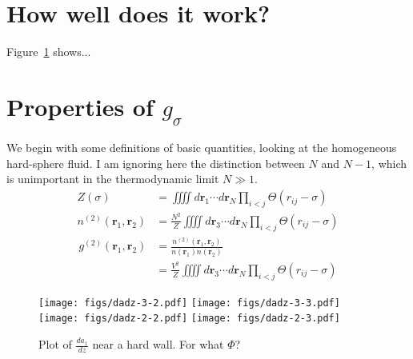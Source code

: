 \documentclass[letterpaper,twocolumn,amsmath,amssymb,pre,aps,10pt]{revtex4-1}
\newcommand{\rr}{\textbf{r}}
\begin{document}
\section{How well does it work?}
Figure~\ref{fig:dadz} shows...

\appendix

\section{Properties of $g_\sigma$}
We begin with some definitions of basic quantities, looking at the
homogeneous hard-sphere fluid.  I am ignoring here the distinction
between $N$ and $N-1$, which is unimportant in the thermodynamic limit
$N\gg 1$.
\begin{align}
  Z(\sigma) &= \iiiint d\rr_1\cdots d\rr_N \prod_{i<j} \Theta(r_{ij}-\sigma)
  \\
  n^{(2)}(\rr_1,\rr_2) &= \frac{N^2}{Z}\iiiint d\rr_3\cdots d\rr_N \prod_{i<j} \Theta(r_{ij}-\sigma)
\end{align}
\begin{align}
  g^{(2)}(\rr_1,\rr_2) &=
  \frac{n^{(2)}(\rr_1,\rr_2)}{n(\rr_1)n(\rr_2)}
  \\
  &= \frac{V^2}{Z}\iiiint d\rr_3\cdots d\rr_N \prod_{i<j}
  \Theta(r_{ij}-\sigma)
  \label{eq:g2-integral-defn}
\end{align}


\begin{figure}
  \texttt{[image: figs/dadz-3-2.pdf]}
  \texttt{[image: figs/dadz-3-3.pdf]}
  \texttt{[image: figs/dadz-2-2.pdf]}
  \texttt{[image: figs/dadz-2-3.pdf]}
  \caption{Plot of $\frac{da_1}{dz}$ near a hard
    wall. For what $\Phi$?}\label{fig:dadz}
\end{figure}
\end{document}
